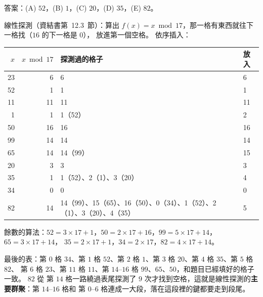 \begin{pastsoln}
答案：(A) $52$，(B) $1$，(C) $20$，(D) $35$，(E) $82$。

線性探測（資結書第~12.3~節）：算出 $f(x) = x \bmod 17$，那一格有東西就往下一格找（$16$ 的下一格是 $0$），
放進第一個空格。 依序插入：
\begin{center}
\begin{tabular}{rrp{7.2cm}l}
\toprule
$x$ & $x \bmod 17$ & 探測過的格子 & 放入 \\
\midrule
23 & 6 & 6 & 6 \\
52 & 1 & 1 & 1 \\
11 & 11 & 11 & 11 \\
1 & 1 & 1（52） & 2 \\
50 & 16 & 16 & 16 \\
99 & 14 & 14 & 14 \\
65 & 14 & 14（99） & 15 \\
20 & 3 & 3 & 3 \\
35 & 1 & 1（52）、2（1）、3（20） & 4 \\
34 & 0 & 0 & 0 \\
82 & 14 & 14（99）、15（65）、16（50）、0（34）、1（52）、2（1）、3（20）、4（35） & 5 \\
\bottomrule
\end{tabular}
\end{center}
餘數的算法：$52 = 3 \times 17 + 1$，$50 = 2 \times 17 + 16$，$99 = 5 \times 17 + 14$，$65 = 3 \times 17 + 14$，
$35 = 2 \times 17 + 1$，$34 = 2 \times 17$，$82 = 4 \times 17 + 14$。

最後的表：第 $0$ 格 $34$、第 $1$ 格 $52$、第 $2$ 格 $1$、第 $3$ 格 $20$、第 $4$ 格 $35$、第 $5$ 格 $82$、
第 $6$ 格 $23$、第 $11$ 格 $11$、第 $14$--$16$ 格 $99$、$65$、$50$，和題目已經填好的格子一致。 $82$ 從
第 $14$ 格一路繞過表尾探測了 $9$ 次才找到空格，這就是線性探測的\textbf{主要群聚}：第 $14$--$16$ 格和
第 $0$--$6$ 格連成一大段，落在這段裡的鍵都要走到段尾。
\end{pastsoln}
